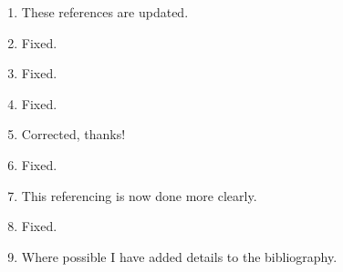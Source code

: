 \documentclass[12pt]{article}
\begin{document}
\begin{enumerate}
		\item These references are updated.
		
		\item Fixed.
		
		\item Fixed.
		
		\item Fixed.
		
		\item Corrected, thanks! 
		
		\item Fixed.
		
		\item This referencing is now done more clearly.
		
		\item Fixed.
		
		\item Where possible I have added details to the bibliography. 
		
	\end{enumerate}
	
	
	
\end{document}
